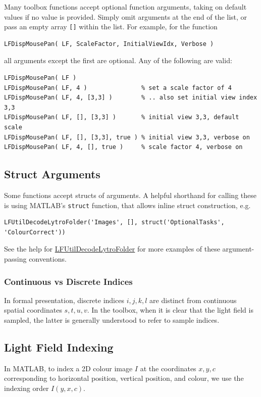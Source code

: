 \documentclass[onecolumn]{article}
\newcommand{\CiteFunc}[1]{\hyperlink{#1}{\small #1}}
\newcommand{\SymbolText}[1]{\texttt{\small #1}}
\begin{document}
Many toolbox functions accept optional function arguments, taking on default values if no value is provided. Simply omit arguments at the end of the list, or pass an empty array \SymbolText{[]} within the list. For example, for the function

\begin{Verbatim}
LFDispMousePan( LF, ScaleFactor, InitialViewIdx, Verbose )
\end{Verbatim}
all arguments except the first are optional. Any of the following are valid:
\begin{Verbatim}
LFDispMousePan( LF ) 
LFDispMousePan( LF, 4 )               % set a scale factor of 4
LFDispMousePan( LF, 4, [3,3] )        % .. also set initial view index 3,3
LFDispMousePan( LF, [], [3,3] )       % initial view 3,3, default scale
LFDispMousePan( LF, [], [3,3], true ) % initial view 3,3, verbose on
LFDispMousePan( LF, 4, [], true )     % scale factor 4, verbose on
\end{Verbatim}

\subsection{Struct Arguments}

Some functions accept structs of arguments. A helpful shorthand for calling these is using MATLAB's \SymbolText{struct} function, that allows inline struct construction, e.g.
\begin{Verbatim}
LFUtilDecodeLytroFolder('Images', [], struct('OptionalTasks', 'ColourCorrect'))
\end{Verbatim}

See the help for \CiteFunc{LFUtilDecodeLytroFolder} for more examples of these argument-passing conventions.

\subsubsection{Continuous vs Discrete Indices}
In formal presentation, discrete indices $i,j,k,l$ are distinct from continuous spatial coordinates $s,t,u,v$. In the toolbox, when it is clear that the light field is sampled, the latter is generally understood to refer to sample indices.

\subsection{Light Field Indexing}

In MATLAB, to index a 2D colour image $I$ at the coordinates $x, y, c$ corresponding to horizontal position, vertical position, and colour, we use the indexing order $I( y,x, c )$. 
\end{document}
